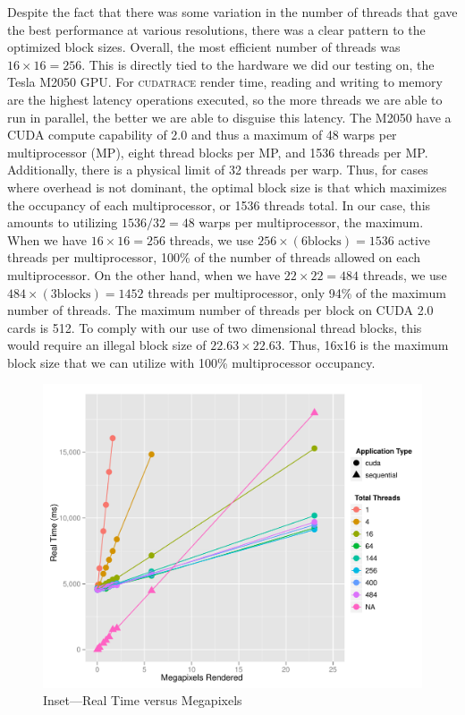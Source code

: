 \documentclass[12pt]{article}
\begin{document}
Despite the fact that there was some variation in the number of threads that gave the best performance at various resolutions, there was a clear pattern to the optimized block sizes. Overall, the most efficient number of threads was $16 \times 16 = 256$. This is directly tied to the hardware we did our testing on, the Tesla M2050 GPU. For \textsc{cudatrace} render time, reading and writing to memory are the highest latency operations executed, so the more threads we are able to run in parallel, the better we are able to disguise this latency. The M2050 have a CUDA compute capability of 2.0 and thus a maximum of 48 warps per multiprocessor (MP), eight thread blocks per MP, and 1536 threads per MP. Additionally, there is a physical limit of 32 threads per warp. Thus, for cases where overhead is not dominant, the optimal block size is that which maximizes the occupancy of each multiprocessor, or 1536 threads total.  In our case, this amounts to utilizing $1536/32 = 48$ warps per multiprocessor, the maximum. When we have $16 \times 16 = 256$ threads, we use $256 \times (6 \text{blocks}) = 1536$ active threads per multiprocessor, 100\% of the number of threads allowed on each multiprocessor. On the other hand, when we have $22 \times 22 = 484$ threads, we use $484 \times (3 \text{blocks}) = 1452$ threads per multiprocessor, only 94\% of the maximum number of threads. The maximum number of threads per block on CUDA 2.0 cards is 512. To comply with our use of two dimensional thread blocks, this would require an illegal block size of $22.63 \times 22.63$. Thus, 16x16 is the maximum block size that we can utilize with 100\% multiprocessor occupancy.

\begin{figure}
    \caption{Inset---Real Time versus Megapixels} \label{fig:real_time_zoom3}
    \begin{center}
\includegraphics{cudatrace-010}
    \end{center}
\end{figure}
\end{document}
